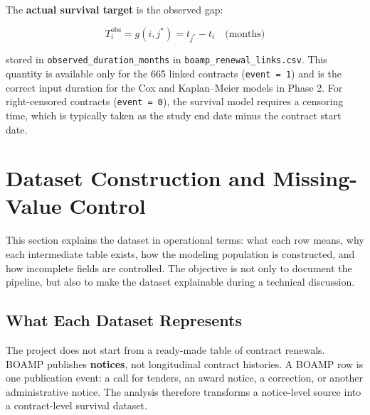 \documentclass[12pt, a4paper]{article}
\begin{document}
\noindent The \textbf{actual survival target} is the observed gap:

\begin{equation}
  T_i^{\text{obs}} = g(i, j^*) = t_{j^*} - t_i \quad \text{(months)}
\end{equation}

stored in \texttt{observed\_duration\_months} in \texttt{boamp\_renewal\_links.csv}.
This quantity is available only for the 665 linked contracts (\texttt{event = 1})
and is the correct input duration for the Cox and Kaplan--Meier models in
Phase 2. For right-censored contracts (\texttt{event = 0}), the survival
model requires a censoring time, which is typically taken as the study end
date minus the contract start date.

\section{Dataset Construction and Missing-Value Control}

This section explains the dataset in operational terms: what each row means,
why each intermediate table exists, how the modeling population is constructed,
and how incomplete fields are controlled. The objective is not only to document
the pipeline, but also to make the dataset explainable during a technical
discussion.

\subsection{What Each Dataset Represents}

The project does not start from a ready-made table of contract renewals. BOAMP
publishes \textbf{notices}, not longitudinal contract histories. A BOAMP row is
one publication event: a call for tenders, an award notice, a correction, or
another administrative notice. The analysis therefore transforms a notice-level
source into a contract-level survival dataset.
\end{document}
